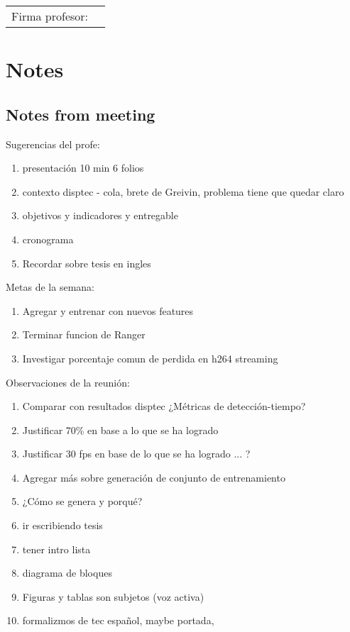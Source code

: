 \documentclass[12pt,oneside]{book}
\begin{document}
  \vfill

  \begin{tabular}{p{3 cm} p{10 cm}}
    Firma profesor: & \\
    \cline{2-2}
  \end{tabular}

  \newpage

  \section*{Notes}
  \setlength\parindent{0pt}

  \subsection*{Notes from meeting}

  Sugerencias del profe:
  \begin{enumerate}
    \item presentación 10 min 6 folios
    \item contexto disptec - cola, brete de Greivin, problema tiene que quedar claro
    \item objetivos y indicadores y entregable
    \item cronograma
    \item Recordar sobre tesis en ingles
  \end{enumerate}

  Metas de la semana:
  \begin{enumerate}
    \item Agregar y entrenar con nuevos features
    \item Terminar funcion de Ranger
    \item Investigar porcentaje comun de perdida en h264 streaming
  \end{enumerate}

  Observaciones de la reunión:
  \begin{enumerate}
    \item Comparar con resultados disptec ¿Métricas de detección-tiempo?
    \item Justificar 70\% en base a lo que se ha logrado
    \item Justificar 30 fps en base de lo que se ha logrado ... ?
    \item Agregar más sobre generación de conjunto de entrenamiento
    \item ¿Cómo se genera y porqué?
    \item ir escribiendo tesis
    \item tener intro lista
    \item diagrama de bloques
    \item Figuras y tablas son subjetos (voz activa)
    \item formalizmos de tec español, maybe portada, 
  \end{enumerate}
\end{document}
